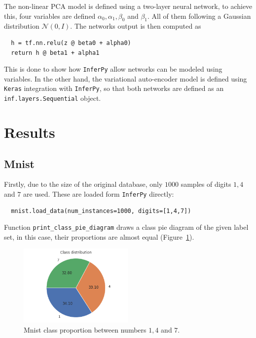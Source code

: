 The non-linear PCA model is defined using a two-layer neural network, to achieve this, four variables are defined \(\alpha_{0}, \alpha_{1}, \beta_{0}\) and \(\beta_{1}\). All of them following a Gaussian distribution \(\mathcal{N}(0, I)\). The networks output is then computed as

\begin{verbatim}
  h = tf.nn.relu(z @ beta0 + alpha0)
  return h @ beta1 + alpha1
\end{verbatim}

This is done to show how \texttt{InferPy} allow networks can be modeled using variables. In the other hand, the variational auto-encoder model is defined using \texttt{Keras} integration with \texttt{InferPy}, so that both networks are defined as an \texttt{inf.layers.Sequential} object.

\section{Results}

\subsection{Mnist}

Firstly, due to the size of the original database, only \(1000\) samples of digits \(1,4\) and \(7\) are used. These are loaded form \texttt{InferPy} directly:

\begin{verbatim}
  mnist.load_data(num_instances=1000, digits=[1,4,7])
\end{verbatim}

Function \texttt{print\_class\_pie\_diagram} draws a class pie diagram of the given label set, in this case, their proportions are almost equal (Figure~\ref{fig:mnist_proportion}).

\begin{figure}
  \centering
  \includegraphics[width = 0.5\textwidth]{tex/images/mnist_proportion.png}
  \caption{Mnist class proportion between numbers \(1, 4\) and \(7\).}\label{fig:mnist_proportion}
\end{figure}

